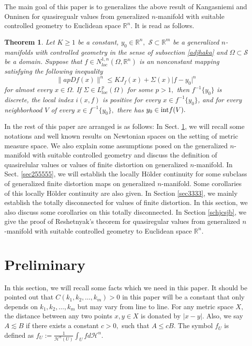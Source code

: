 \documentclass[11pt,twoside]{article}
\newtheorem{thm}{Theorem}[section]
\theoremstyle{definition}
\theoremstyle{remark}
\newcommand{\aleq}{\lesssim}
\begin{document}
The main goal of this paper is to generalizes the above result of Kangasniemi and  Onninen \cite{KO222} for quasiregualr values from generalized $n$-manifold with suitable controlled geometry to Euclidean space $\mathbb{R}^{n}.$ It is read as follows.
 \begin{thm}\label{00990099199}
Let $K\geq1$ be a constant,  $y_{0}\in\mathbb{R}^{n},$ $\mathcal{S}\subset \mathbb{R}^{m}$ be a generalized $n$-manifolds with controlled geometry in the sense of subsection \ref{adjhaka} and 
$\Omega\subset\mathcal{S}$ be a domain. Suppose that $f\in N_{loc}^{1,n}(\Omega,\mathbb{R}^{n})$ is an nonconstant mapping  satisfying  the following inequality
\begin{equation}\label{---1}
\|apDf(x)\|^{n}\leq KJ_{f}(x)+\Sigma(x)\vert f-y_{0}\vert^{n}
\end{equation}
for almost every $x\in\Omega.$ If $\Sigma\in L_{loc}^{p}(\Omega)$ for some $p>1,$  then $f^{-1}\{y_{0}\}$ is discrete, the local index $i(x,f)$ is positive for every $x\in f^{-1}\{y_{0}\}$, and for every neighborhood $V$ of every  $x\in f^{-1}\{y_{0}\},$  there has $y_{0}\in {\rm int}f(V).$
\end{thm}
In the rest of this paper are arranged is as follows: In Sect. \ref{sec2222}, we will recall some notations and well known results on Newtonian spaces on the setting of metric measure space. We also  explain some assumptions posed on the generalized $n$-manifold with suitable controlled geometry and discuss the definition of  quasirelular values or values of finite distortion on generalized $n$-manifold. In Sect. \ref{sec255555},
we will establish the locally H\"{o}lder continuity for some subclass of generalized finite distortion maps on generalized $n$-manifold. Some corollaries of this locally H\"{o}lder continuity are also given.
  In  Section \ref{sec3333}, we mainly establish the totally disconnected for values of finite distortion. In this section, we also discuss some corollaries on this totally disconnected.
  In Section \ref{schjcsjb}, we give the proof of Reshetnyak's theorem for quasiregular values from generalized $n$-manifold with suitable controlled geometry to Euclidean space $\mathbb{R}^{n}.$
 
 
 











\section{Preliminary}\label{sec2222}
In this section, we will recall some facts which we need in this paper. It should be pointed out that  $C(k_{1},k_{2},\ldots,k_{m})>0$ in this paper will be a constant that only depends on $k_{1},k_{2},\ldots,k_{m}$ but may vary from line to line. For any metric space $X,$ the distance between any two points $x,y\in X$ is donated by $\vert x-y\vert.$ Also,  we say $A\aleq B$ if there exists a constant $c>0,$ such that $A\leq cB.$
The symbol $f_{U}$ is defined as  $f_{U}:=\frac{1}{\mathcal{H}^{n}(U)}\int_{U} f d\mathcal{H}^{n}.$
\end{document}
